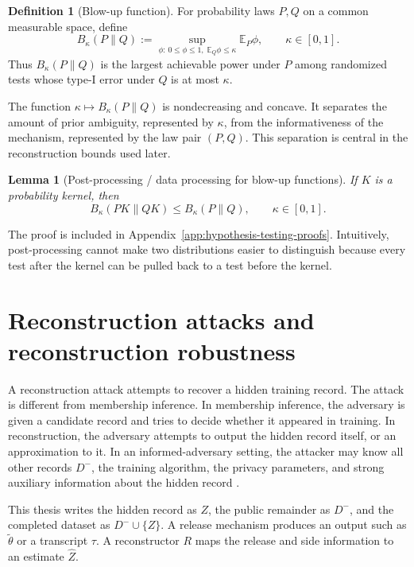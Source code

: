 \documentclass[11pt,a4paper]{report}
\theoremstyle{plain}
\newtheorem{lemma}[theorem]{Lemma}
\theoremstyle{definition}
\newtheorem{definition}[theorem]{Definition}
\theoremstyle{remark}
\newcommand{\E}{\mathbb{E}}
\begin{document}
\begin{definition}[Blow-up function]
For probability laws $P,Q$ on a common measurable space, define
\[
B_\kappa(P\|Q)
:=
\sup_{\phi:\,0\le\phi\le1,\;\E_Q\phi\le\kappa}
\E_P\phi,
\qquad
\kappa\in[0,1].
\]
Thus $B_\kappa(P\|Q)$ is the largest achievable power under $P$ among randomized tests whose type-I error under $Q$ is at most $\kappa$.
\end{definition}

The function $\kappa\mapsto B_\kappa(P\|Q)$ is nondecreasing and concave.  It separates the amount of prior ambiguity, represented by $\kappa$, from the informativeness of the mechanism, represented by the law pair $(P,Q)$.  This separation is central in the reconstruction bounds used later.

\begin{lemma}[Post-processing / data processing for blow-up functions]
\label{lem:post-processing}
If $K$ is a probability kernel, then
\[
B_\kappa(PK\|QK)\le B_\kappa(P\|Q),
\qquad \kappa\in[0,1].
\]
\end{lemma}

The proof is included in Appendix~\ref{app:hypothesis-testing-proofs}.  Intuitively, post-processing cannot make two distributions easier to distinguish because every test after the kernel can be pulled back to a test before the kernel.

\section{Reconstruction attacks and reconstruction robustness}
\label{sec:bg-reconstruction}

A reconstruction attack attempts to recover a hidden training record.  The attack is different from membership inference.  In membership inference, the adversary is given a candidate record and tries to decide whether it appeared in training.  In reconstruction, the adversary attempts to output the hidden record itself, or an approximation to it.  In an informed-adversary setting, the attacker may know all other records $D^-$, the training algorithm, the privacy parameters, and strong auxiliary information about the hidden record \cite{balle2022informed}.

This thesis writes the hidden record as $Z$, the public remainder as $D^-$, and the completed dataset as $D^-\cup\{Z\}$.  A release mechanism produces an output such as $\widetilde\theta$ or a transcript $\tau$.  A reconstructor $R$ maps the release and side information to an estimate $\widehat Z$.
\end{document}
